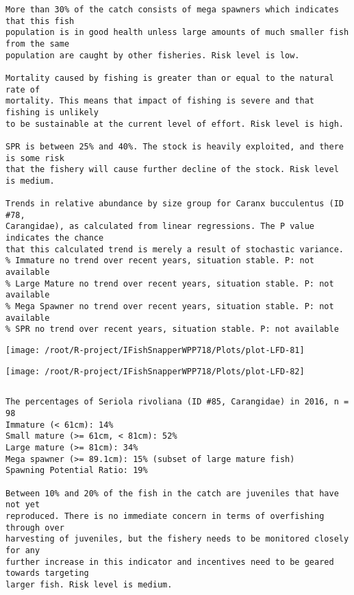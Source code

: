 \documentclass{report}\usepackage[]{graphicx}\usepackage[]{color}
\makeatletter
\def\maxwidth{ %
  \ifdim\Gin@nat@width>\linewidth
    \linewidth
  \else
    \Gin@nat@width
  \fi
}
\newenvironment{kframe}{%
 \def\at@end@of@kframe{}%
 \ifinner\ifhmode%
  \def\at@end@of@kframe{\end{minipage}}%
  \begin{minipage}{\columnwidth}%
 \fi\fi%
 \def\FrameCommand##1{\hskip\@totalleftmargin \hskip-\fboxsep
 \colorbox{shadecolor}{##1}\hskip-\fboxsep
     \hskip-\linewidth \hskip-\@totalleftmargin \hskip\columnwidth}%
 \MakeFramed {\advance\hsize-\width
   \@totalleftmargin\z@ \linewidth\hsize
   \@setminipage}}%
 {\par\unskip\endMakeFramed%
 \at@end@of@kframe}
\newenvironment{knitrout}{}{} %
\makeatother
\begin{document}
\begin{knitrout}
\begin{kframe}
\begin{verbatim}
More than 30% of the catch consists of mega spawners which indicates that this fish
population is in good health unless large amounts of much smaller fish from the same
population are caught by other fisheries. Risk level is low.
 
Mortality caused by fishing is greater than or equal to the natural rate of
mortality. This means that impact of fishing is severe and that fishing is unlikely
to be sustainable at the current level of effort. Risk level is high.
 
SPR is between 25% and 40%. The stock is heavily exploited, and there is some risk
that the fishery will cause further decline of the stock. Risk level is medium.
 
Trends in relative abundance by size group for Caranx bucculentus (ID #78,
Carangidae), as calculated from linear regressions. The P value indicates the chance
that this calculated trend is merely a result of stochastic variance.
% Immature no trend over recent years, situation stable. P: not available
% Large Mature no trend over recent years, situation stable. P: not available
% Mega Spawner no trend over recent years, situation stable. P: not available
% SPR no trend over recent years, situation stable. P: not available
\end{verbatim}
\end{kframe}
\texttt{[image: /root/R-project/IFishSnapperWPP718/Plots/plot-LFD-81]} 

\texttt{[image: /root/R-project/IFishSnapperWPP718/Plots/plot-LFD-82]} 
\begin{kframe}\begin{verbatim}
\end{verbatim}
\end{kframe}
\clearpage
\newpage
\begin{kframe}\begin{verbatim}The percentages of Seriola rivoliana (ID #85, Carangidae) in 2016, n = 98
Immature (< 61cm): 14%
Small mature (>= 61cm, < 81cm): 52%
Large mature (>= 81cm): 34%
Mega spawner (>= 89.1cm): 15% (subset of large mature fish)
Spawning Potential Ratio: 19%
 
Between 10% and 20% of the fish in the catch are juveniles that have not yet
reproduced. There is no immediate concern in terms of overfishing through over
harvesting of juveniles, but the fishery needs to be monitored closely for any
further increase in this indicator and incentives need to be geared towards targeting
larger fish. Risk level is medium.


\end{verbatim}
\end{kframe}
\end{knitrout}
\end{document}
